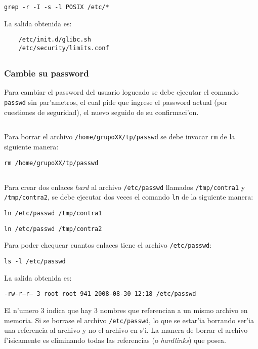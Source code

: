 \texttt{grep -r -I -s -l POSIX /etc/*}

La salida obtenida es:
      \begin{mylisting}
      \begin{verbatim}
	/etc/init.d/glibc.sh
	/etc/security/limits.conf
      \end{verbatim}
      \end{mylisting}

\subsection{}
\subsubsection[]{Cambie su password}
Para cambiar el password del usuario logueado se debe ejecutar el comando \texttt{passwd} sin par'ametros, el cual pide que ingrese el password actual (por cuestiones de seguridad), el nuevo seguido de su confirmaci'on. 

\subsection{}
Para borrar el archivo \texttt{/home/grupoXX/tp/passwd} se debe invocar \texttt{rm} de la siguiente manera:

\texttt{rm /home/grupoXX/tp/passwd}

\subsection{}
Para crear dos enlaces \emph{hard} al archivo \texttt{/etc/passwd} llamados \texttt{/tmp/contra1} y \texttt{/tmp/contra2}, se debe ejecutar dos veces el comando \texttt{ln} de la siguiente manera:

\texttt{ln /etc/passwd /tmp/contra1}

\texttt{ln /etc/passwd /tmp/contra2}

Para poder chequear cuantos enlaces tiene el archivo \texttt{/etc/passwd}:

\texttt{ls -l /etc/passwd}

La salida obtenida es:

\texttt{-rw-r--r--  3 root     root      941 2008-08-30 12:18 /etc/passwd}

El n'umero 3 indica que hay 3 nombres que referencian a un mismo archivo en memoria. Si se borrase el archivo \texttt{/etc/passwd}, lo que se estar'ia borrando ser'ia una referencia al archivo y no el archivo en s'i. La manera de borrar el archivo f'isicamente es eliminando todas las referencias (o \emph{hardlinks}) que posea.

